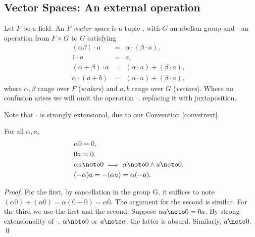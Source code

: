 \subsection{Vector Spaces: An external operation}

\begin{definition}
Let $F$ be a field.  An $F$-{\em vector space\/} is a 
tuple , with $G$ an abelian group and $\cdot$ 
an operation from $F\times G$ to $G$ satisfying
\begin{eqnarray*}
(\alpha\beta) \cdot a &=& \alpha\cdot(\beta\cdot a),\\
1\cdot a &=& a,\\
(\alpha+\beta)\cdot a &=& (\alpha\cdot a) + (\beta\cdot a),\\
\alpha\cdot(a+b) &=& (\alpha\cdot a) + (\beta\cdot a).
\end{eqnarray*}
where $\alpha,\beta$ range over $F$ (\emph{scalars}) and $a,b$ range
over $G$ (\emph{vectors}).
Where no confusion arises we will omit the operation $\cdot$,
replacing it with juxtaposition. 
\end{definition}
Note that $\cdot$ is strongly extensional, due to our Convention
\ref{convstrext}.

\begin{lemma} For all $\alpha,a$,
\begin{eqnarray*}
& \alpha 0 = 0,\\
& 0 a = 0,\\
& \alpha a \noto 0 \implies \alpha\noto 0 \wedge a\noto 0,\\
& (-\alpha)a =  -(\alpha a)  = \alpha(-a).
\end{eqnarray*}
\end{lemma}
\begin{proof}
For the first, by cancellation in the group G, it suffices to note
$(\alpha 0)+(\alpha 0)=\alpha (0+0)=\alpha 0$.
The argument for the second is similar. For the third we use the first
and the second. Suppose $\alpha a \noto 0=0 a$. By strong
extensionality of $\cdot$, $\alpha\noto 0$ or $a\noto a$; the latter is absurd.
Similarly, $a\noto 0$. \qed
\end{proof}

